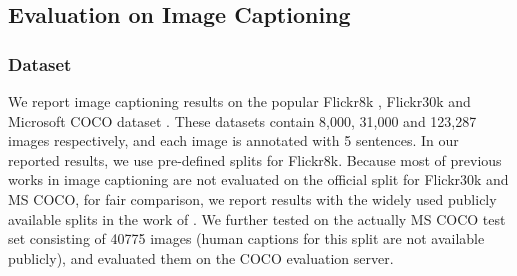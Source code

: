 %

\subsection{Evaluation on Image Captioning}
\subsubsection{Dataset}
%
We report image captioning results on the popular Flickr8k \cite{hodosh2013framing}, Flickr30k \cite{young2014image} and Microsoft COCO dataset \cite{lin2014microsoft}. These datasets contain 8,000, 31,000 and 123,287 images respectively, and each image is annotated with 5 sentences. In our reported results, we use pre-defined splits for Flickr8k.%
Because most of previous works in image captioning \cite{donahue2014long,fang2014captions,Karpathy2014deepvs,mao2014deep,vinyals2014show,xu2015show} are not evaluated on the official split for Flickr30k and MS COCO, for fair comparison, we report results with the widely used publicly available splits in the work of \cite{Karpathy2014deepvs}.%
We further tested on the actually MS COCO test set consisting of 40775 images (human captions for this split are not available publicly), and evaluated them on the COCO evaluation server.

